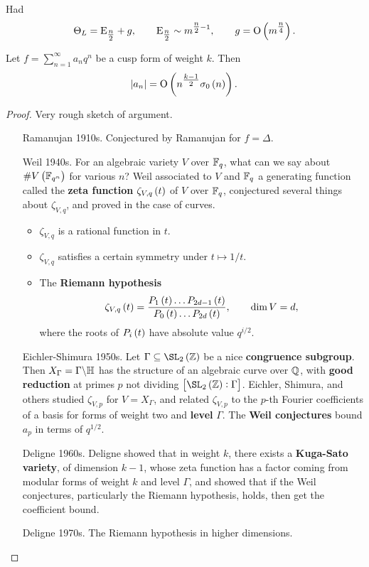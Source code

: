 Had
$$ \Theta_L = \E_{\tfrac{n}{2}} + g, \qquad \E_{\tfrac{n}{2}} \sim m^{\tfrac{n}{2} - 1}, \qquad g = \O\br{m^{\tfrac{n}{4}}}. $$

\begin{theorem}[Deligne]
Let $ f = \sum_{n = 1}^\infty a_nq^n $ be a cusp form of weight $ k $. Then
$$ \abs{a_n} = \O\br{n^{\tfrac{k - 1}{2}}\sigma_0\br{n}}. $$
\end{theorem}

\begin{proof}
Very rough sketch of argument.
\begin{itemize}[leftmargin=1in]
\item[Ramanujan 1910s.] Conjectured by Ramanujan for $ f = \Delta $.
\item[Weil 1940s.] For an algebraic variety $ V $ over $ \mathbb{F}_q $, what can we say about $ \#V\br{\FF_{q^n}} $ for various $ n $? Weil associated to $ V $ and $ \mathbb{F}_q $ a generating function called the \textbf{zeta function} $ \zeta_{V, q}\br{t} $ of $ V $ over $ \mathbb{F}_q $, conjectured several things about $ \zeta_{V, q} $, and proved in the case of curves.
\begin{itemize}
\item $ \zeta_{V, q} $ is a rational function in $ t $.
\item $ \zeta_{V, q} $ satisfies a certain symmetry under $ t \mapsto 1 / t $.
\item The \textbf{Riemann hypothesis}
$$ \zeta_{V, q}\br{t} = \dfrac{P_1\br{t} \dots P_{2d - 1}\br{t}}{P_0\br{t} \dots P_{2d}\br{t}}, \qquad \dim V = d, $$
where the roots of $ P_i\br{t} $ have absolute value $ q^{i / 2} $.
\end{itemize}
\item[Eichler-Shimura 1950s.] Let $ \Gamma \subseteq \SL_2\br{\ZZ} $ be a nice \textbf{congruence subgroup}. Then $ X_\Gamma = \Gamma \backslash \mathbb{H} $ has the structure of an algebraic curve over $ \mathbb{Q} $, with \textbf{good reduction} at primes $ p $ not dividing $ \sbr{\SL_2\br{\ZZ} : \Gamma} $. Eichler, Shimura, and others studied $ \zeta_{V, p} $ for $ V = X_\Gamma $, and related $ \zeta_{V, p} $ to the $ p $-th Fourier coefficients of a basis for forms of weight two and \textbf{level} $ \Gamma $. The \textbf{Weil conjectures} bound $ a_p $ in terms of $ q^{1 / 2} $.
\item[Deligne 1960s.] Deligne showed that in weight $ k $, there exists a \textbf{Kuga-Sato variety}, of dimension $ k - 1 $, whose zeta function has a factor coming from modular forms of weight $ k $ and level $ \Gamma $, and showed that if the Weil conjectures, particularly the Riemann hypothesis, holds, then get the coefficient bound.
\item[Deligne 1970s.] The Riemann hypothesis in higher dimensions.
\end{itemize}
\end{proof}


